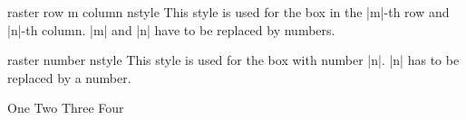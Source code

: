 \begin{docTcbKey}[][doc new=2014-11-10]{raster row m column n}{}{style}
This style is used for the box in the
|m|-th row and |n|-th column.
|m| and |n| have to be replaced by numbers.
\end{docTcbKey}


\begin{docTcbKey}[][doc new=2014-11-10]{raster number n}{}{style}
This style is used for the box with number |n|.
|n| has to be replaced by a number.
\begin{dispExample}
\begin{tcbitemize}[size=small,colframe=red!50!black,colback=red!10!white,
  raster number 4/.style={colframe=blue!50!black,colback=blue!10!white}]
  \tcbitem One
  \tcbitem Two
  \tcbitem Three
  \tcbitem Four
\end{tcbitemize}
\end{dispExample}
\end{docTcbKey}



